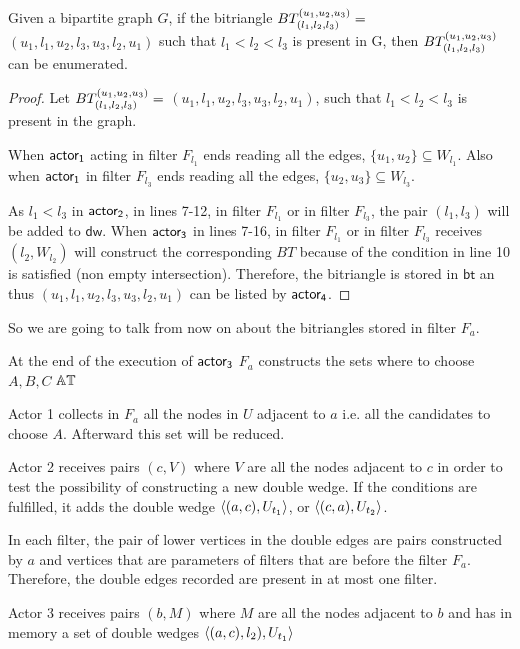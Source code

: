 \begin{theorem}\label{TH-all}Given a bipartite graph $G$, if the bitriangle $BT_{(l_1, l_2,l_3)}^{(u_1, u_2, u_3)} =$  $(u_1,l_1,u_2,l_3,u_3,l_2,u_1)$ such that $l_1 < l_2 <l_3$ is present in G, then $BT_{(l_1, l_2,l_3)}^{(u_1, u_2, u_3)}$ can be enumerated.
\end{theorem}


\begin{proof}
\iffalse
Obvious from the definition of $I,J,K$  and the algorithm of obtaining bitriangles. 
\fi
  Let $BT_{(l_1, l_2,l_3)}^{(u_1, u_2, u_3)} =$  $(u_1,l_1,u_2,l_3,u_3,l_2,u_1)$, such that $l_1 < l_2 <l_3$ is present in the graph. 

When $\mathsf{actor_1}$ acting in filter $F_{l_1}$ ends reading all the edges, $\{u_1,u_2\} \subseteq W_{l_1}$. Also when $\mathsf{actor_1}$ in filter $F_{l_3}$ ends reading all the edges, $\{u_2,u_3\} \subseteq W_{l_3}$. 

As $l_1 < l_3$ in $\mathsf{actor_2}$, in lines 7-12, in filter $F_{l_1}$ or in filter $F_{l_3}$, the pair $(l_1,l_3)$  will be added to 
$\mathsf{dw}$. When $\mathsf{actor_3}$ in lines 7-16, in filter $F_{l_1}$ or in filter $F_{l_3}$ receives $(l_2, W_{l_2})$  will construct the corresponding  $BT$ because of the condition in line 10 is satisfied (non empty intersection). Therefore, the bitriangle is stored in $\mathsf{bt}$ an thus $(u_1,l_1,u_2,l_3,u_3,l_2,u_1)$ can be listed by $\mathsf{actor_4}$.
\end{proof}
\iffalse
So we are going to talk from now on about the bitriangles stored in filter $F_a$.

At the end of the execution of $\mathsf{actor_3}$ $F_a$ constructs the sets where to choose $A,B,C$ $\mathbb{AT}$

Actor 1 collects in $F_a$ all the nodes in $U$ adjacent to $a$ i.e. all the candidates to choose $A$. Afterward this set will be reduced. 

Actor 2 receives pairs $(c,V)$ where $V$ are all the nodes adjacent to $c$ in order to test the possibility of constructing a new double wedge.  If the conditions are fulfilled, it adds the double wedge $\left\langle (a,c), U_{t_1} \right\rangle$,  or $\left\langle (c, a), U_{t_2} \right\rangle$. 

In each filter, the pair of lower vertices in the double edges are pairs constructed by $a$ and vertices that are parameters of filters that are before the filter $F_a$. Therefore, the double edges recorded are present in at most one filter.

Actor 3 receives pairs $(b,M) $ where $M$ are all the nodes adjacent to $b$ and has in memory a set of double wedges $\left\langle (a,c), l_2), U_{t_1} \right\rangle$

